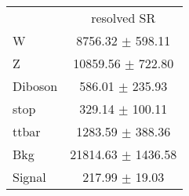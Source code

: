 \begin{tabular}{l|c|}
\cline{2-2}
 & \multicolumn{1}{c|}{resolved SR}\\
W & 8756.32 $\pm$ 598.11\\
Z & 10859.56 $\pm$ 722.80\\
Diboson & 586.01 $\pm$ 235.93\\
stop & 329.14 $\pm$ 100.11\\
ttbar & 1283.59 $\pm$ 388.36\\
\hline
Bkg & 21814.63 $\pm$ 1436.58\\
\hline
Signal & 217.99 $\pm$ 19.03\\
\end{tabular}
